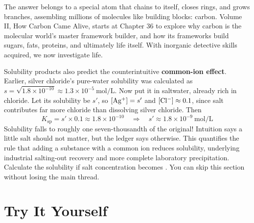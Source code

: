 The answer belongs to a special atom that chains to itself, closes rings, and grows branches, assembling millions of molecules like building blocks: carbon. Volume II, How Carbon Came Alive, starts at Chapter 36 to explore why carbon is the molecular world's master framework builder, and how its frameworks build sugars, fats, proteins, and ultimately life itself. With inorganic detective skills acquired, we now investigate life.

\begin{tiaozhan}
Solubility products also predict the counterintuitive \textbf{common-ion effect}. Earlier, silver chloride's pure-water solubility was calculated as $s=\sqrt{1.8\times10^{-10}}\approx1.3\times10^{-5}\ \mathrm{mol/L}$. Now put it in  saltwater, already rich in chloride. Let its solubility be $s'$, so $[\mathrm{Ag^+}]=s'$ and $[\mathrm{Cl^-}]\approx0.1$, since salt contributes far more chloride than dissolving silver chloride. Then
\[K_{\mathrm{sp}} = s'\times0.1 \approx 1.8\times10^{-10} \quad\Rightarrow\quad s'\approx1.8\times10^{-9}\ \mathrm{mol/L}\]
Solubility falls to roughly one seven-thousandth of the original! Intuition says a little salt should not matter, but the ledger says otherwise. This quantifies the rule that adding a substance with a common ion reduces solubility, underlying industrial salting-out recovery and more complete laboratory precipitation. Calculate the solubility if salt concentration becomes . You can skip this section without losing the main thread.
\end{tiaozhan}

\section*{Try It Yourself}


